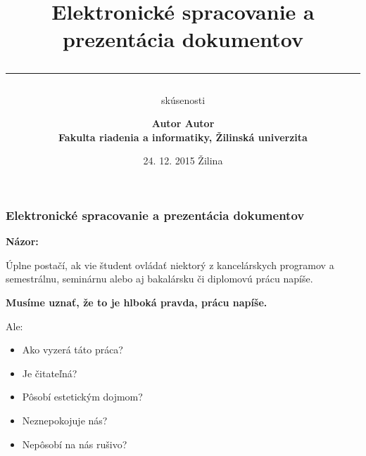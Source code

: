 \documentclass[compress,aspectratio=32]{beamer}
\def\Bmodra{\color{blue!90!black}}
\newcommand\fsectionN[1][|]{\bf{\Large\bf\color{white!80!blue}\sectionN\ #1\ }\color{white!90!black}\large\bf}
\begin{document}
\title{\bf\color{yellow!90!black} 
Elektronické spracovanie a prezentácia dokumentov \\[-.5em]
\color{white!50!blue}\rule{.9\linewidth}{.5pt}}
\subtitle{\color{white!80!blue} skúsenosti }
\author[rb]{\Large\bf Autor Autor\\
\large Fakulta riadenia a informatiky, Žilinská univerzita}
\date{24. 12. 2015 Žilina}


\begin{frame}[t]
\titlepage
\end{frame}

\def\sectionN{Elektronické spracovanie a prezentácia dokumentov}
\begin{frame}[t]
\frametitle{\fsectionN[]}
{\bf\Bmodra Názor:} 

Úplne postačí, ak vie študent ovládať niektorý z kancelárskych programov 
a semestrálnu, seminárnu alebo aj bakalársku či diplomovú prácu napíše.
\pause

\smallskip

{\bf\Bmodra Musíme uznať, že to je hlboká pravda, prácu napíše.
\pause 

Ale:} 

\begin{itemize}
\item Ako vyzerá táto práca?   
                               
\item Je čitateľná?            
                               
\item Pôsobí estetickým dojmom?

\item Neznepokojuje nás?                  
                                          
\item Nepôsobí na nás rušivo?             
                                          
\end{itemize}
\end{frame}
\end{document}
